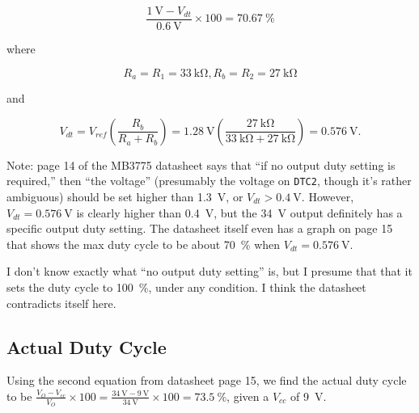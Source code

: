\documentclass{article}
\newcommand{\Vcc}{$V_{cc}$}
\newcommand{\chippin}{\texttt}
\newcommand{\model}{\textsf}
\begin{document}
\begin{displaymath}
  \frac{\qty{1}{\volt} - V_{dt}}{\qty{0.6}{\volt}} \times{} 100 = \qty{70.67}{\%}
\end{displaymath}

\noindent
where

\begin{displaymath}
  R_a = R_1 = \qty{33}{\kilo\ohm},R_b = R_2 = \qty{27}{\kilo\ohm}
\end{displaymath}

\noindent
and

\begin{displaymath}
  V_{dt} =  V_{ref}\left(\frac{R_b}{R_a+R_b}\right) =
  \qty{1.28}{\volt}\left(\frac{\qty{27}{\kilo\ohm}}{\qty{33}{\kilo\ohm} +
      \qty{27}{\kilo\ohm}}\right) = \qty{0.576}{\volt}.
\end{displaymath}

Note: page 14 of the \model{MB3775} datasheet says that ``if no output
duty setting is required,'' then ``the voltage'' (presumably the
voltage on \chippin{DTC2}, though it's rather ambiguous) should be set
higher than \qty{1.3}{\volt}, or $V_{dt} > \qty{0.4}{\volt}$. However,
$V_{dt} = \qty{0.576}{\volt}$ is clearly higher than \qty{0.4}{\volt},
but the \qty{34}{\volt} output definitely has a specific output duty
setting. The datasheet itself even has a graph on page 15 that shows
the max duty cycle to be about \qty{70}{\%} when
$V_{dt} = \qty{0.576}{\volt}$.

I don't know exactly what ``no output duty setting'' is, but I presume
that that it sets the duty cycle to \qty{100}{\%}, under any
condition. I think the datasheet contradicts itself here.

\subsection{Actual Duty Cycle}
\label{sec:34v_actual_duty_cycle}
Using the second equation from datasheet page 15, we find the actual
duty cycle to be
$\frac{V_O - V_{cc}}{V_O} \times{} 100 = \frac{\qty{34}{\volt} -
  \qty{9}{\volt}}{\qty{34}{\volt}} \times{} 100 = \qty{73.5}{\%}$,
given a \Vcc{} of \qty{9}{\volt}.

\end{document}
